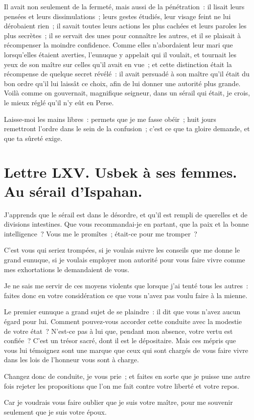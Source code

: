 \documentclass[french,twoside]{book} %
\newcommand{\bibl}[1]{{\RaggedLeft{#1}\par\bigskip}}
\begin{document}
Il avait non seulement de la fermeté, mais aussi de la pénétration : il lisait leurs pensées et leurs dissimulations ; leurs gestes étudiés, leur visage feint ne lui dérobaient rien ; il savait toutes leurs actions les plus cachées et leurs paroles les plus secrètes ; il se servait des unes pour connaître les autres, et il se plaisait à récompenser la moindre confidence. Comme elles n’abordaient leur mari que lorsqu’elles étaient averties, l’eunuque y appelait qui il voulait, et tournait les yeux de son maître sur celles qu’il avait en vue ; et cette distinction était la récompense de quelque secret révélé : il avait persuadé à son maître qu’il était du bon ordre qu’il lui laissât ce choix, afin de lui donner une autorité plus grande. Voilà comme on gouvernait, magnifique seigneur, dans un sérail qui était, je crois, le mieux réglé qu’il n’y eût en Perse.\par
Laisse-moi les mains libres : permets que je me fasse obéir ; huit jours remettront l’ordre dans le sein de la confusion ; c’est ce que ta gloire demande, et que ta sûreté exige.\par

\bibl{De ton sérail d’Ispahan, le 9 de la lune de Rebiab I, 1714.}
\section[{Lettre LXV. Usbek à ses femmes. Au sérail d’Ispahan.}]{Lettre LXV. Usbek à ses femmes. Au sérail d’Ispahan.}\renewcommand{\leftmark}{Lettre LXV. Usbek à ses femmes. Au sérail d’Ispahan.}

\noindent J’apprends que le sérail est dans le désordre, et qu’il est rempli de querelles et de divisions intestines. Que vous recommandai-je en partant, que la paix et la bonne intelligence ? Vous me le promîtes ; était-ce pour me tromper ?\par
C’est vous qui seriez trompées, si je voulais suivre les conseils que me donne le grand eunuque, si je voulais employer mon autorité pour vous faire vivre comme mes exhortations le demandaient de vous.\par
Je ne sais me servir de ces moyens violents que lorsque j’ai tenté tous les autres : faites donc en votre considération ce que vous n’avez pas voulu faire à la mienne.\par
Le premier eunuque a grand sujet de se plaindre : il dit que vous n’avez aucun égard pour lui. Comment pouvez-vous accorder cette conduite avec la modestie de votre état ? N’est-ce pas à lui que, pendant mon absence, votre vertu est confiée ? C’est un trésor sacré, dont il est le dépositaire. Mais ces mépris que vous lui témoignez sont une marque que ceux qui sont chargés de vous faire vivre dans les lois de l’honneur vous sont à charge.\par
Changez donc de conduite, je vous prie ; et faites en sorte que je puisse une autre fois rejeter les propositions que l’on me fait contre votre liberté et votre repos.\par
Car je voudrais vous faire oublier que je suis votre maître, pour me souvenir seulement que je suis votre époux.\par
\end{document}
